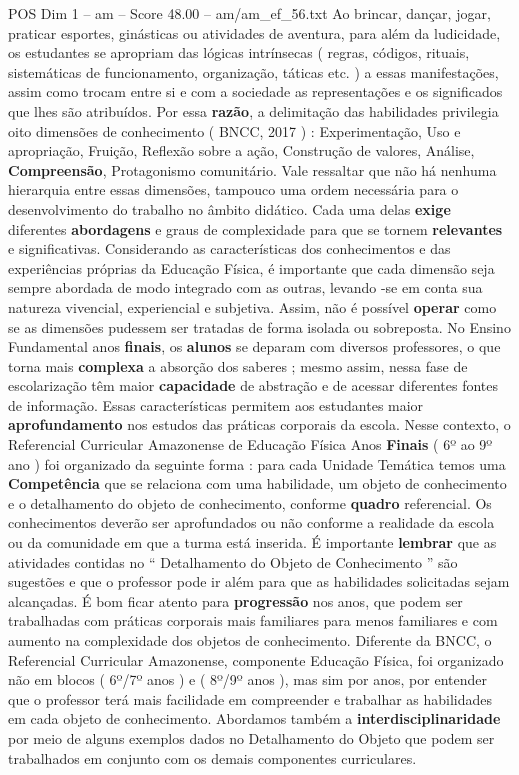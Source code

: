 \begin{textsample}{POS Dim 1 – am – Score 48.00 – am/am\_ef\_56.txt}
Ao brincar, dançar, jogar, praticar esportes, ginásticas ou atividades de aventura, para além da ludicidade, os estudantes se apropriam das lógicas intrínsecas ( regras, códigos, rituais, sistemáticas de funcionamento, organização, táticas etc. ) a essas manifestações, assim como trocam entre si e com a sociedade as representações e os significados que lhes são atribuídos.
Por essa \textbf{razão}, a delimitação das habilidades privilegia oito dimensões de conhecimento ( BNCC, 2017 ) : Experimentação, Uso e apropriação, Fruição, Reflexão sobre a ação, Construção de valores, Análise, \textbf{Compreensão}, Protagonismo comunitário.
Vale ressaltar que não há nenhuma hierarquia entre essas dimensões, tampouco uma ordem necessária para o desenvolvimento do trabalho no âmbito didático.
Cada uma delas \textbf{exige} diferentes \textbf{abordagens} e graus de complexidade para que se tornem \textbf{relevantes} e significativas.
Considerando as características dos conhecimentos e das experiências próprias da Educação Física, é importante que cada dimensão seja sempre abordada de modo integrado com as outras, levando -se em conta sua natureza vivencial, experiencial e subjetiva.
Assim, não é possível \textbf{operar} como se as dimensões pudessem ser tratadas de forma isolada ou sobreposta.
No Ensino Fundamental anos \textbf{finais}, os \textbf{alunos} se deparam com diversos professores, o que torna mais \textbf{complexa} a absorção dos saberes ; mesmo assim, nessa fase de escolarização têm maior \textbf{capacidade} de abstração e de acessar diferentes fontes de informação.
Essas características permitem aos estudantes maior \textbf{aprofundamento} nos estudos das práticas corporais da escola.
Nesse contexto, o Referencial Curricular Amazonense de Educação Física Anos \textbf{Finais} ( 6º ao 9º ano ) foi organizado da seguinte forma : para cada Unidade Temática temos uma \textbf{Competência} que se relaciona com uma habilidade, um objeto de conhecimento e o detalhamento do objeto de conhecimento, conforme \textbf{quadro} referencial.
Os conhecimentos deverão ser aprofundados ou não conforme a realidade da escola ou da comunidade em que a turma está inserida.
É importante \textbf{lembrar} que as atividades contidas no “ Detalhamento do Objeto de Conhecimento ” são sugestões e que o professor pode ir além para que as habilidades solicitadas sejam alcançadas.
É bom ficar atento para \textbf{progressão} nos anos, que podem ser trabalhadas com práticas corporais mais familiares para menos familiares e com aumento na complexidade dos objetos de conhecimento.
Diferente da BNCC, o Referencial Curricular Amazonense, componente Educação Física, foi organizado não em blocos ( 6º/7º anos ) e ( 8º/9º anos ), mas sim por anos, por entender que o professor terá mais facilidade em compreender e trabalhar as habilidades em cada objeto de conhecimento.
Abordamos também a \textbf{interdisciplinaridade} por meio de alguns exemplos dados no Detalhamento do Objeto que podem ser trabalhados em conjunto com os demais componentes curriculares.


\end{textsample}
